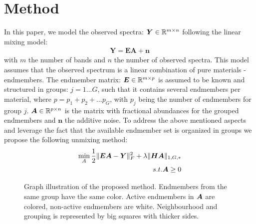 \documentclass{article}
\newlength\myheight
\begin{document}
\section{Method}
In this paper, we model the observed spectra: $\mbox{\boldmath$Y$} \in \mathbb{R}^{m \times n}$ following the linear mixing model: 
\begin{eqnarray}
\mathbf{Y}= \mathbf{E}\mathbf{A} + \mathbf{n}
\end{eqnarray}
with $m$ the number of bands and $n$ the number of observed spectra. 
This model assumes that the observed spectrum is a linear combination of pure materials - endmembers. The endmember matrix: $\mbox{\boldmath$E$} \in \mathbb{R}^{m \times p}$ is assumed to be known and structured in groups: $j = 1...G$, such that it contains several endmembers per material, where $p = p_1 + p_2 + ... p_G$, with $p_j$ being the number of endmembers for group $j$. 
$\mbox{\boldmath$A$} \in \mathbb{R}^{p \times n}$ is the matrix with fractional abundances for the grouped endmembers and $\mathbf{n}$ the additive noise. 
To address the above mentioned aspects and
leverage the fact that the  available endmember set is organized in groups we propose the following unmixing method:
\begin{eqnarray} 
\label{eqn:obj}
\min_{A} \frac{1}{2} \| \mbox{\boldmath$E$} \mbox{\boldmath$A$} -\mbox{\boldmath$Y$} \|_F^2 +\lambda\| \mbox{\boldmath$H$}\mbox{\boldmath$A$} \|_{1,G,*}  \\
\quad s.t. \mbox{\boldmath$A$} \geq 0  \nonumber
\end{eqnarray} 
\begin{figure}[h]   
	\captionsetup[subfigure]{labelformat=empty,font=small}
	\settoheight{}
	\centering
	 \hspace{1mm} 
	\caption{Graph illustration of the proposed method. Endmembers from the same group have the same color. Active endmembers in $\mbox{\boldmath$A$}$ are colored, non-active endmembers are white. Neighbourhood and grouping is represented by big squares with thicker sides. 
}
\label{BuildingParameters}
\end{figure}
\end{document}
